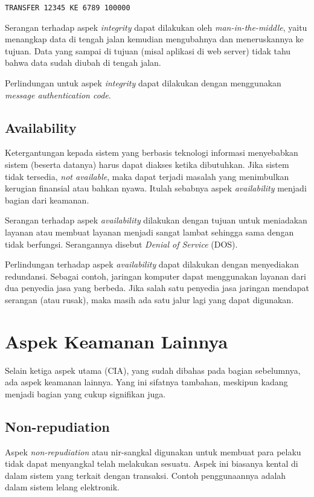 \begin{verbatim}
TRANSFER 12345 KE 6789 100000
\end{verbatim}

Serangan terhadap aspek {\em integrity} dapat dilakukan oleh
{\em man-in-the-middle}, yaitu menangkap data di tengah jalan
kemudian mengubahnya dan meneruskannya ke tujuan.
Data yang sampai di tujuan (misal aplikasi di web server) tidak tahu
bahwa data sudah diubah di tengah jalan.

Perlindungan untuk aspek {\em integrity} dapat dilakukan dengan
menggunakan {\em message authentication code}.


\subsection{Availability}
Ketergantungan kepada sistem yang berbasis teknologi informasi
menyebabkan sistem (beserta datanya) harus dapat diakses ketika dibutuhkan.
Jika sistem tidak tersedia, {\em not available}, maka dapat terjadi
masalah yang menimbulkan kerugian finansial atau bahkan nyawa.
Itulah sebabnya aspek {\em availability} menjadi bagian dari keamanan.

Serangan terhadap aspek {\em availability} dilakukan dengan tujuan
untuk meniadakan layanan atau membuat layanan menjadi sangat lambat
sehingga sama dengan tidak berfungsi.
Serangannya disebut {\em Denial of Service} (DOS).

Perlindungan terhadap aspek {\em availability} dapat dilakukan
dengan menyediakan redundansi.
Sebagai contoh, jaringan komputer dapat menggunakan layanan dari
dua penyedia jasa yang berbeda.
Jika salah satu penyedia jasa jaringan mendapat serangan (atau rusak),
maka masih ada satu jalur lagi yang dapat digunakan.


\section{Aspek Keamanan Lainnya}
Selain ketiga aspek utama (CIA), yang sudah dibahas pada bagian sebelumnya,
ada aspek keamanan lainnya. Yang ini sifatnya tambahan, meskipun
kadang menjadi bagian yang cukup signifikan juga.

\subsection{Non-repudiation}
Aspek {\em non-repudiation} atau nir-sangkal digunakan untuk
membuat para pelaku tidak dapat menyangkal telah melakukan sesuatu.
Aspek ini biasanya kental di dalam sistem yang terkait dengan transaksi.
Contoh penggunaannya adalah dalam sistem lelang elektronik.

